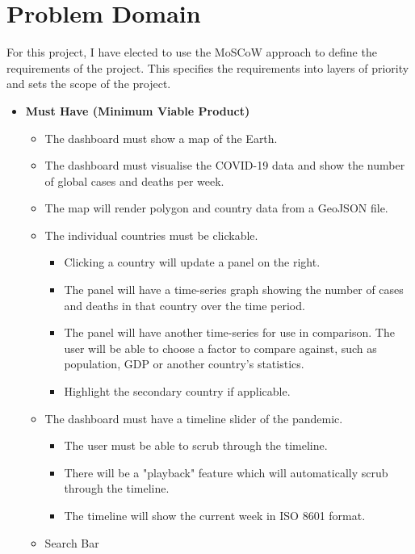 \documentclass{report}
\begin{document}
\chapter{Problem Domain}
For this project, I have elected to use the MoSCoW approach to define the requirements of the project. This specifies the requirements into layers of priority and sets the scope of the project.\\
\begin{itemize}
    \item \textbf{\Large{Must Have (Minimum Viable Product)}}
    \begin{itemize}
        \item The dashboard must show a map of the Earth.
        \item The dashboard must visualise the COVID-19 data and show the number of global cases and deaths per week.
        \item The map will render polygon and country data from a GeoJSON file.
        \item The individual countries must be clickable.
        \begin{itemize}
            \item Clicking a country will update a panel on the right.
            \item The panel will have a time-series graph showing the number of cases and deaths in that country over the time period.
            \item The panel will have another time-series for use in comparison. The user will be able to choose a factor to compare against, such as population, GDP or another country's statistics.
            \item Highlight the secondary country if applicable.
        \end{itemize}
        \item The dashboard must have a timeline slider of the pandemic.
        \begin{itemize}
            \item The user must be able to scrub through the timeline.
            \item There will be a "playback" feature which will automatically scrub through the timeline.
            \item The timeline will show the current week in ISO 8601 format.
        \end{itemize}
        \item Search Bar
        \begin{itemize}

\end{itemize}
\end{itemize}
\end{itemize}
\end{document}
